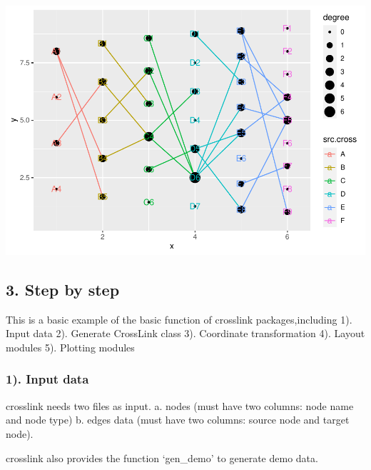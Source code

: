 \documentclass[
]{article}
\newenvironment{Shaded}{\begin{snugshade}}{\end{snugshade}}
\newcommand{\CommentTok}[1]{\textcolor[rgb]{0.56,0.35,0.01}{\textit{#1}}}
\newcommand{\DataTypeTok}[1]{\textcolor[rgb]{0.13,0.29,0.53}{#1}}
\newcommand{\DecValTok}[1]{\textcolor[rgb]{0.00,0.00,0.81}{#1}}
\newcommand{\KeywordTok}[1]{\textcolor[rgb]{0.13,0.29,0.53}{\textbf{#1}}}
\newcommand{\NormalTok}[1]{#1}
\newcommand{\OperatorTok}[1]{\textcolor[rgb]{0.81,0.36,0.00}{\textbf{#1}}}
\newcommand{\StringTok}[1]{\textcolor[rgb]{0.31,0.60,0.02}{#1}}
\begin{document}
\includegraphics{ReadMe1_files/figure-latex/unnamed-chunk-3-1.pdf}

\hypertarget{step-by-step}{%
\subsection{3. Step by step}\label{step-by-step}}

This is a basic example of the basic function of crosslink
packages,including 1). Input data 2). Generate CrossLink class 3).
Coordinate transformation 4). Layout modules 5). Plotting modules

\hypertarget{input-data}{%
\subsubsection{1). Input data}\label{input-data}}

crosslink needs two files as input. a. nodes (must have two columns:
node name and node type) b. edges data (must have two columns: source
node and target node).

crosslink also provides the function `gen\_demo' to generate demo data.

\begin{Shaded}
\end{Shaded}
\end{document}
